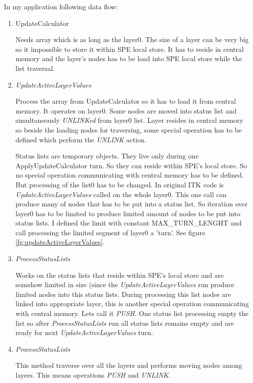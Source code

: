 In my application following data flow:
\begin{enumerate}
\item UpdateCalculator
\par
Needs array which is as long as the layer0.
The size of a layer can be very big so it impossible to store it within SPE local store.
It has to reside in central memory and the layer's nodes has to be load into SPE local store while the list traversal.

\item \emph{UpdateActiveLayerValues}
\par
Process the array from UpdateCalculator so it has to load it from central memory.
It operates on layer0.
Some nodes are moved into status list and simultaneously \emph{UNLINKed} from layer0 list.
Layer resides in central memory so beside the loading nodes for traversing, some special operation has to be defined which perform the \emph{UNLINK} action.
\par
Status lists are temporary objects. They live only during one ApplyUpdateCalculator turn.
So they can reside within SPE's local store.
So no special operation communicating with central memory has to be defined.
But processing of the list0 has to be changed.
In original ITK code is \emph{UpdateActiveLayerValues} called on the whole layer0.
This one call can produce many of nodes that has to be put into a status list.
So iteration over layer0 has to be limited to produce limited amount of nodes to be put into status lists.
I defined the limit with constant MAX\_TURN\_LENGHT and call processing the limited segment of layer0 a 'turn'.
See figure \ref{fg:updateActiveLayerValues}.

\item \emph{ProcessStatusLists}
\par
Works on the status lists that reside within SPE's local store and are somehow limited in size (since the \emph{UpdateActiveLayerValues} run produce limited nodes into this status lists.
During processing this list nodes are linked into appropriate layer, this is another special operation communicating with central memory.
Lets call it \emph{PUSH}.
One status list processing empty the list so after \emph{ProcessStatusLists} run all status lists remains empty and are ready for next \emph{UpdateActiveLayerValues} turn.

\item \emph{ProcessStatusLists}
\par
This method traverse over all the layers and performs moving nodes among layers.
This means operations \emph{PUSH} and \emph{UNLINK}.
\end{enumerate}

